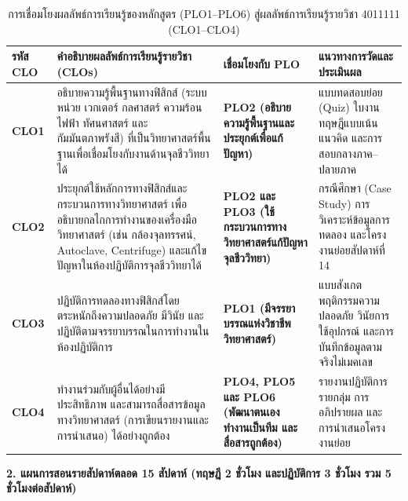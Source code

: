 \begin{table}[H]
\centering
\caption{การเชื่อมโยงผลลัพธ์การเรียนรู้ของหลักสูตร (PLO1--PLO6) สู่ผลลัพธ์การเรียนรู้รายวิชา 4011111 (CLO1--CLO4)}
\small
\begin{tabularx}{\textwidth}{>{\raggedright\arraybackslash\bfseries}p{2.0cm} >{\raggedright\arraybackslash}X >{\raggedright\arraybackslash\bfseries}p{2.8cm} >{\raggedright\arraybackslash}X}
\toprule
รหัส CLO & คำอธิบายผลลัพธ์การเรียนรู้รายวิชา (CLOs) & เชื่อมโยงกับ PLO & แนวทางการวัดและประเมินผล \\
\midrule
CLO1 & อธิบายความรู้พื้นฐานทางฟิสิกส์ (ระบบหน่วย เวกเตอร์ กลศาสตร์ ความร้อน ไฟฟ้า ทัศนศาสตร์ และกัมมันตภาพรังสี) ที่เป็นวิทยาศาสตร์พื้นฐานเพื่อเชื่อมโยงกับงานด้านจุลชีววิทยาได้ & PLO2 (อธิบายความรู้พื้นฐานและประยุกต์เพื่อแก้ปัญหา) & แบบทดสอบย่อย (Quiz) ใบงานทฤษฎีแบบเน้นแนวคิด และการสอบกลางภาค--ปลายภาค \\
\addlinespace[4pt]
CLO2 & ประยุกต์ใช้หลักการทางฟิสิกส์และกระบวนการทางวิทยาศาสตร์ เพื่ออธิบายกลไกการทำงานของเครื่องมือวิทยาศาสตร์ (เช่น กล้องจุลทรรศน์, Autoclave, Centrifuge) และแก้ไขปัญหาในห้องปฏิบัติการจุลชีววิทยาได้ & PLO2 และ PLO3 (ใช้กระบวนการทางวิทยาศาสตร์แก้ปัญหาจุลชีววิทยา) & กรณีศึกษา (Case Study) การวิเคราะห์ข้อมูลการทดลอง และโครงงานย่อยสัปดาห์ที่ 14 \\
\addlinespace[4pt]
CLO3 & ปฏิบัติการทดลองทางฟิสิกส์โดยตระหนักถึงความปลอดภัย มีวินัย และปฏิบัติตามจรรยาบรรณในการทำงานในห้องปฏิบัติการ & PLO1 (มีจรรยาบรรณแห่งวิชาชีพวิทยาศาสตร์) & แบบสังเกตพฤติกรรมความปลอดภัย วินัยการใช้อุปกรณ์ และการบันทึกข้อมูลตามจริงไม่เมคเลข \\
\addlinespace[4pt]
CLO4 & ทำงานร่วมกับผู้อื่นได้อย่างมีประสิทธิภาพ และสามารถสื่อสารข้อมูลทางวิทยาศาสตร์ (การเขียนรายงานและการนำเสนอ) ได้อย่างถูกต้อง & PLO4, PLO5 และ PLO6 (พัฒนาตนเอง ทำงานเป็นทีม และสื่อสารถูกต้อง) & รายงานปฏิบัติการรายกลุ่ม การอภิปรายผล และการนำเสนอโครงงานย่อย \\
\bottomrule
\end{tabularx}
\end{table}

\vspace{0.2cm}
\noindent\textbf{2. แผนการสอนรายสัปดาห์ตลอด 15 สัปดาห์ (ทฤษฎี 2 ชั่วโมง และปฏิบัติการ 3 ชั่วโมง รวม 5 ชั่วโมงต่อสัปดาห์)}

